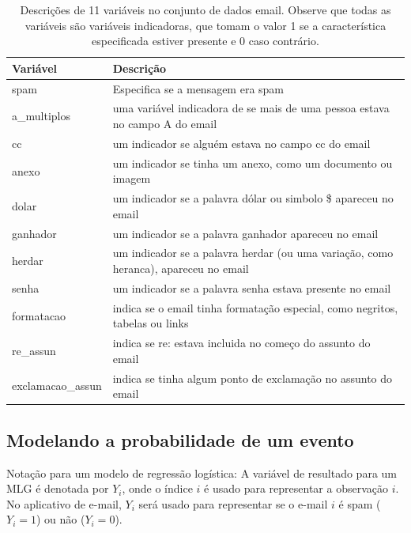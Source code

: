 \documentclass[
]{book}
\theoremstyle{definition}
\theoremstyle{definition}
\theoremstyle{definition}
\theoremstyle{definition}
\theoremstyle{remark}
\begin{document}
\begin{table}

\caption{\label{tab:emailVariables}Descrições de 11 variáveis no conjunto de dados email. Observe que todas as variáveis são variáveis indicadoras, que tomam o valor 1 se a característica especificada estiver presente e 0 caso contrário.}
\centering
\begin{tabular}[t]{l|l}
\hline
Variável & Descrição\\
\hline
spam & Especifica se a mensagem era spam\\
\hline
a\_multiplos & uma variável indicadora de se mais de uma pessoa estava no campo A do email\\
\hline
cc & um indicador se alguém estava no campo cc do email\\
\hline
anexo & um indicador se tinha um anexo, como um documento ou imagem\\
\hline
dolar & um indicador se a palavra dólar ou simbolo \$ apareceu no email\\
\hline
ganhador & um indicador se a palavra ganhador apareceu no email\\
\hline
herdar & um indicador se a palavra herdar (ou uma variação, como heranca), apareceu no email\\
\hline
senha & um indicador se a palavra senha estava presente no email\\
\hline
formatacao & indica se o email tinha formatação especial, como negritos, tabelas ou links\\
\hline
re\_assun & indica se re: estava incluida no começo do assunto do email\\
\hline
exclamacao\_assun & indica se tinha algum ponto de exclamação no assunto do email\\
\hline
\end{tabular}
\end{table}

\hypertarget{modelingTheProbabilityOfAnEvent}{%
\subsection{Modelando a probabilidade de um evento}\label{modelingTheProbabilityOfAnEvent}}

Notação para um modelo de regressão logística: A variável de resultado para um MLG é denotada por \(Y_i\), onde o índice \(i\) é usado para representar a observação \(i\). No aplicativo de e-mail, \(Y_i\) será usado para representar se o e-mail \(i\) é spam (\(Y_i=1\)) ou não (\(Y_i=0\)).
\end{document}
